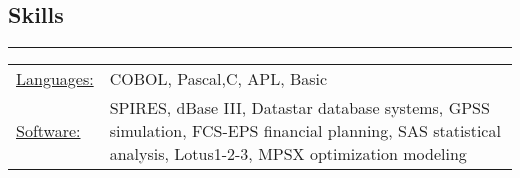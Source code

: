 \documentclass{res}
\begin{document}
\begin{resume}
\section{{\large Skills}}

\vspace{-10pt}
\noindent\rule{\resumewidth}{0.4pt}   %
\vspace{-5pt}

   \begin{tabular}{l p{3in}}
    \underline{Languages:} & COBOL, Pascal,C, APL, Basic \\

     \underline{Software:} &  SPIRES, dBase III, Datastar database 
                        systems, GPSS simulation, FCS-EPS financial 
                        planning, SAS statistical analysis, 
                        Lotus1-2-3, MPSX optimization modeling 
 \end{tabular}

\end{resume} 
\end{document}
